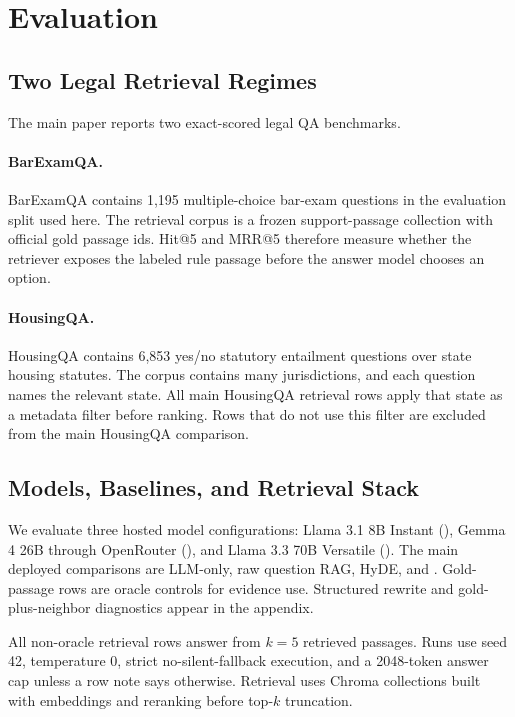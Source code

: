 \section{Evaluation}\label{sec:experiment}

\subsection{Two Legal Retrieval Regimes}

The main paper reports two exact-scored legal QA benchmarks.



\paragraph{BarExamQA.}
BarExamQA contains 1,195 multiple-choice bar-exam questions in the evaluation
split used here. The retrieval corpus is a frozen support-passage collection
with official gold passage ids. Hit@5 and MRR@5 therefore measure whether the
retriever exposes the labeled rule passage before the answer model chooses an
option.

\paragraph{HousingQA.}
HousingQA contains 6,853 yes/no statutory entailment questions over state
housing statutes. The corpus contains many jurisdictions, and each question
names the relevant state. All main HousingQA retrieval rows apply that state as
a metadata filter before ranking. Rows that do not use this filter are excluded
from the main HousingQA comparison.

\subsection{Models, Baselines, and Retrieval Stack}

We evaluate three hosted model configurations: Llama 3.1 8B Instant
(), Gemma 4 26B through OpenRouter
(), and Llama 3.3 70B Versatile
(). The main deployed comparisons are LLM-only, raw
question RAG, HyDE, and \hyre{}. Gold-passage rows are oracle controls for
evidence use. Structured rewrite and gold-plus-neighbor diagnostics appear in
the appendix.

All non-oracle retrieval rows answer from $k=5$ retrieved passages. Runs use
seed 42, temperature 0, strict no-silent-fallback execution, and a 2048-token
answer cap unless a row note says otherwise. Retrieval uses Chroma collections
built with  embeddings and
 reranking before top-$k$
truncation.

